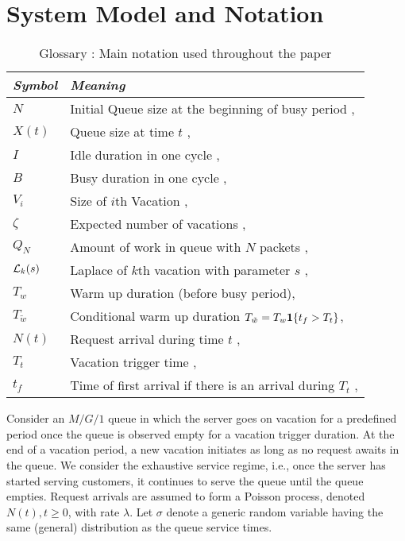 \documentclass[journal]{IEEEtran}
\def\bone{{\mathrm 1\!\!I}}
\def\bone{{\textbf 1}}
\begin{document}
\section{System Model and Notation}
\label{s:model}
\begin{table}

\centering
\begin{tabular}{p{}p{}}
\hline
{\it Symbol} & {\it Meaning}\\
\hline
\hline $N$ & Initial Queue size at the beginning of busy period ,\\
$X(t)$ & Queue size at time $t$ ,\\
$I$ & Idle duration in one cycle ,\\
$B$ & Busy duration in one cycle ,\\
$V_i$ & Size of $i$th Vacation ,\\
$\zeta$ & Expected number of vacations ,\\
$Q_N$ & Amount of work in queue with $N$ packets ,\\
${\cal L}_k(s)$ & Laplace of $k$th vacation with parameter $s$ ,\\
$T_w$ & Warm up duration (before busy period),\\
$T_{\tilde{w}}$ & Conditional warm up duration $T_{\tilde{w}}=T_w\bone\{t_f>T_t\}$,\\
$N(t)$ & Request arrival during time $t$ ,\\
$T_t$ & Vacation trigger time ,\\
$t_f$ & Time of first arrival if there is an arrival during $T_t$ ,\\
\hline
\end{tabular}\caption{Glossary : Main notation used throughout the paper}\label{tab:notation}
\end{table}




Consider an $M/G/1$ queue in which the server goes on vacation for a predefined period once the queue is observed empty for a vacation trigger duration. At the end of a vacation period, a new vacation initiates as long as no request awaits in the queue. We consider the exhaustive service regime, i.e., once the server has started serving customers, it continues to serve the queue until the queue empties. Request arrivals are assumed to form a Poisson process, denoted $N(t),t\geq0$, with rate $\lambda$. Let $\sigma$ denote a generic random variable having the same (general) distribution as the queue service times.
\end{document}
